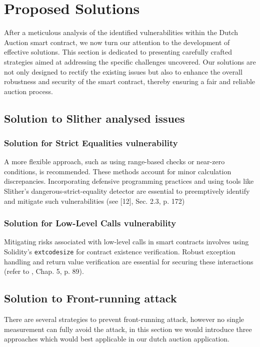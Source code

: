 \documentclass[conference]{IEEEtran}
\begin{document}
\section{Proposed Solutions}\label{sec:solutions}
After a meticulous analysis of the identified vulnerabilities within the Dutch Auction smart contract, we now turn our attention to the development of effective solutions. This section is dedicated to presenting carefully crafted strategies aimed at addressing the specific challenges uncovered. Our solutions are not only designed to rectify the existing issues but also to enhance the overall robustness and security of the smart contract, thereby ensuring a fair and reliable auction process.

\subsection{Solution to Slither analysed issues}
\subsubsection{Solution for Strict Equalities vulnerability}
A more flexible approach, such as using range-based checks or near-zero conditions, is recommended. These methods account for minor calculation
discrepancies. Incorporating defensive programming practices
and using tools like Slither’s dangerous-strict-equality detector are essential to preemptively identify and mitigate such
vulnerabilities (see [12], Sec. 2.3, p. 172)

\subsubsection{Solution for Low-Level Calls vulnerability}
Mitigating risks associated with low-level calls in smart contracts involves using Solidity's \texttt{extcodesize} for contract existence verification. Robust exception handling and return value verification are essential for securing these interactions (refer to \cite{wohrer2018security}, Chap. 5, p. 89).


\subsection{Solution to Front-running attack}
There are several strategies to prevent front-running attack, however no single measurement can fully avoid the attack, in this section we would introduce three approaches which would best applicable in our dutch auction application.
\end{document}
